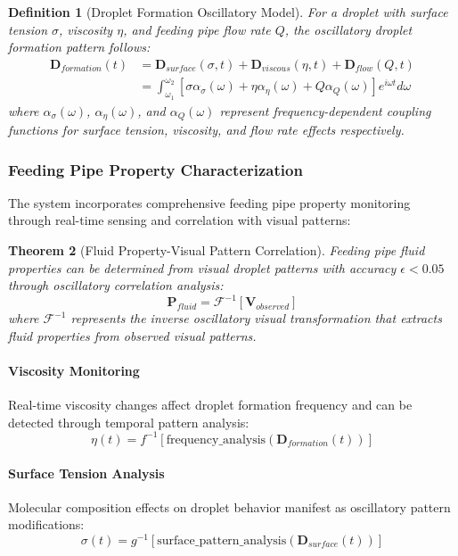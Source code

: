 \documentclass[11pt,a4paper]{article}
\newtheorem{theorem}{Theorem}[section]
\newtheorem{definition}[theorem]{Definition}
\theoremstyle{remark}
\begin{document}
\begin{definition}[Droplet Formation Oscillatory Model]
For a droplet with surface tension $\sigma$, viscosity $\eta$, and feeding pipe flow rate $Q$, the oscillatory droplet formation pattern follows:
\begin{align}
\mathbf{D}_{formation}(t) &= \mathbf{D}_{surface}(\sigma, t) + \mathbf{D}_{viscous}(\eta, t) + \mathbf{D}_{flow}(Q, t)\\
&= \int_{\omega_1}^{\omega_2} \left[\sigma \alpha_{\sigma}(\omega) + \eta \alpha_{\eta}(\omega) + Q \alpha_{Q}(\omega)\right] e^{i\omega t} d\omega
\end{align}
where $\alpha_{\sigma}(\omega)$, $\alpha_{\eta}(\omega)$, and $\alpha_{Q}(\omega)$ represent frequency-dependent coupling functions for surface tension, viscosity, and flow rate effects respectively.
\end{definition}

\subsubsection{Feeding Pipe Property Characterization}

The system incorporates comprehensive feeding pipe property monitoring through real-time sensing and correlation with visual patterns:

\begin{theorem}[Fluid Property-Visual Pattern Correlation]
Feeding pipe fluid properties can be determined from visual droplet patterns with accuracy $\epsilon < 0.05$ through oscillatory correlation analysis:
\begin{equation}
\mathbf{P}_{fluid} = \mathcal{F}^{-1}[\mathbf{V}_{observed}]
\end{equation}
where $\mathcal{F}^{-1}$ represents the inverse oscillatory visual transformation that extracts fluid properties from observed visual patterns.
\end{theorem}

\paragraph{Viscosity Monitoring} Real-time viscosity changes affect droplet formation frequency and can be detected through temporal pattern analysis:
\begin{equation}
\eta(t) = f^{-1}[\text{frequency\_analysis}(\mathbf{D}_{formation}(t))]
\end{equation}

\paragraph{Surface Tension Analysis} Molecular composition effects on droplet behavior manifest as oscillatory pattern modifications:
\begin{equation}
\sigma(t) = g^{-1}[\text{surface\_pattern\_analysis}(\mathbf{D}_{surface}(t))]
\end{equation}
\end{document}
